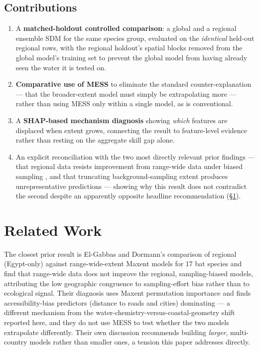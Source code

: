 \subsection{Contributions}

\begin{enumerate}\itemsep2pt
\item A \textbf{matched-holdout controlled comparison}: a global and a
regional ensemble SDM for the same species group, evaluated on the
\emph{identical} \NHoldout{} held-out regional rows, with the regional
holdout's spatial blocks removed from the global model's training set to
prevent the global model from having already seen the water it is tested on.
\item \textbf{Comparative use of MESS} to eliminate the standard
counter-explanation --- that the broader-extent model must simply be
extrapolating more --- rather than using MESS only within a single model, as
is conventional.
\item A \textbf{SHAP-based mechanism diagnosis} showing \emph{which} features
are displaced when extent grows, connecting the result to feature-level
evidence rather than resting on the aggregate skill gap alone.
\item An explicit reconciliation with the two most directly relevant prior
findings --- that regional data resists improvement from range-wide data under
biased sampling \citep{elgabbas2018}, and that truncating background-sampling
extent produces unrepresentative predictions \citep{hanberry2026} --- showing
why this result does not contradict the second despite an apparently opposite
headline recommendation (\S\ref{sec:related}).
\end{enumerate}

\section{Related Work}
\label{sec:related}

 The closest prior result
is El-Gabbas and Dormann's comparison of regional (Egypt-only) against
range-wide-extent Maxent models for 17 bat species and find that range-wide
data does not improve the regional, sampling-biased models, attributing the
low geographic congruence to sampling-effort bias rather than to ecological
signal. Their diagnosis uses Maxent permutation importance and finds
accessibility-bias predictors (distance to roads and cities) dominating ---
a different mechanism from the water-chemistry-versus-coastal-geometry shift
reported here, and they do not use MESS to test whether the two models
extrapolate differently. Their own discussion recommends building
\emph{larger}, multi-country models rather than smaller ones, a tension this
paper addresses directly.

